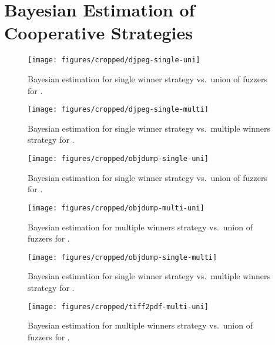 \chapter{Bayesian Estimation of Cooperative Strategies}


\begin{figure}[h]
    \centering%
    \texttt{[image: figures/cropped/djpeg-single-uni]}
    \caption{Bayesian estimation for single winner strategy vs.\ union of
    fuzzers for \djpeg.}
    \label{fig:best-djpeg-single-union}
\end{figure}

\begin{figure}[h]
    \centering%
    \texttt{[image: figures/cropped/djpeg-single-multi]}
    \caption{Bayesian estimation for single winner strategy vs.\ multiple
    winners strategy for \djpeg.}
    \label{fig:best-djpeg-single-multi}
\end{figure}


\begin{figure}[h]
    \centering%
    \texttt{[image: figures/cropped/objdump-single-uni]}
    \caption{Bayesian estimation for single winner strategy vs.\ union of
    fuzzers for \objdump.}
    \label{fig:best-objdump-single-union}
\end{figure}

\begin{figure}[h]
    \centering%
    \texttt{[image: figures/cropped/objdump-multi-uni]}
    \caption{Bayesian estimation for multiple winners strategy vs.\ union of
    fuzzers for \objdump.}
    \label{fig:best-objdump-multi-union}
\end{figure}

\begin{figure}[h]
    \centering%
    \texttt{[image: figures/cropped/objdump-single-multi]}
    \caption{Bayesian estimation for single winner strategy vs.\ multiple
    winners strategy for \objdump.}
    \label{fig:best-objdump-single-multi}
\end{figure}


\begin{figure}[h]
    \centering%
    \texttt{[image: figures/cropped/tiff2pdf-multi-uni]}
    \caption{Bayesian estimation for multiple winners strategy vs.\ union of
    fuzzers for \tiffpdf.}
    \label{fig:best-tiff2pdf-multi-union}
\end{figure}


